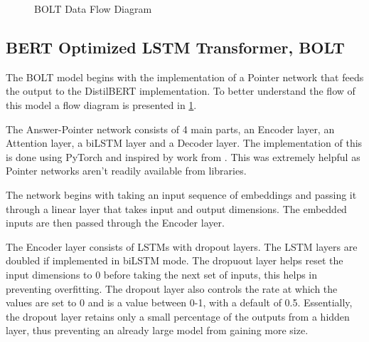 \documentclass[a4paper,12pt]{report}
\begin{document}
\begin{figure}[!h]
\begin{center}
                             		\end{center}
                             		\caption{BOLT Data Flow Diagram}\label{dataflowDiagram}
                             	\end{figure}

            \subsection{BERT Optimized LSTM Transformer, BOLT}\label{c421}

                The BOLT model begins with the implementation of a Pointer network that feeds the output to the DistilBERT implementation. To better understand the flow of this model a flow diagram is presented in \ref{dataflowDiagram}.

                The Answer-Pointer network consists of 4 main parts, an Encoder layer, an Attention layer, a biLSTM layer and a Decoder layer. The implementation of this is done using PyTorch and inspired by work from \citep{pointernetGit}. This was extremely helpful as Pointer networks aren't readily available from libraries.

                The network begins with taking an input sequence of embeddings and passing it through a linear layer that takes input and output dimensions. The embedded inputs are then passed through the Encoder layer.

                The Encoder layer consists of LSTMs with dropout layers. The LSTM layers are doubled if implemented in biLSTM mode. The dropuout layer helps reset the input dimensions to 0 before taking the next set of inputs, this helps in preventing overfitting. The dropout layer also controls the rate at which the values are set to 0 and is a value between 0-1, with a default of 0.5. Essentially, the dropout layer retains only a small percentage of the outputs from a hidden layer, thus preventing an already large model from gaining more size.
\end{document}
